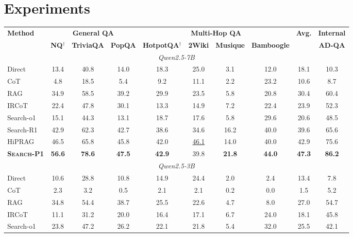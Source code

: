\documentclass[11pt]{article}
\newcommand{\method}{\textsc{Search-P1}\xspace}
\begin{document}
\section{Experiments}
\label{sec:experiments}

\begin{table}[t]
\centering
\small
\setlength{\tabcolsep}{5pt}
\renewcommand{\arraystretch}{1.1}
\begin{tabular}{l|ccc|cccc|c|c}
\toprule
\multirow{2}{*}{\textbf{Method}} & \multicolumn{3}{c|}{\textbf{General QA}} & \multicolumn{4}{c|}{\textbf{Multi-Hop QA}} & \multirow{2}{*}{\textbf{Avg.}} & \textbf{Internal} \\
& \textbf{NQ$^\dagger$} & \textbf{TriviaQA} & \textbf{PopQA} & \textbf{HotpotQA$^\dagger$} & \textbf{2Wiki} & \textbf{Musique} & \textbf{Bamboogle} & & \textbf{AD-QA} \\
\midrule
\multicolumn{10}{c}{\textit{Qwen2.5-7B}} \\
\midrule
Direct & 13.4 & 40.8 & 14.0 & 18.3 & 25.0 & 3.1 & 12.0 & 18.1 & 10.3 \\
CoT & 4.8 & 18.5 & 5.4 & 9.2 & 11.1 & 2.2 & 23.2 & 10.6 & 8.7 \\
RAG & 34.9 & 58.5 & 39.2 & 29.9 & 23.5 & 5.8 & 20.8 & 30.4 & 60.4 \\
IRCoT & 22.4 & 47.8 & 30.1 & 13.3 & 14.9 & 7.2 & 22.4 & 23.9 & 52.3 \\
Search-o1 & 15.1 & 44.3 & 13.1 & 18.7 & 17.6 & 5.8 & 29.6 & 20.6 & 48.5 \\
\midrule
Search-R1 & 42.9 & 62.3 & 42.7 & 38.6 & 34.6 & 16.2 & 40.0 & 39.6 & 65.6 \\
HiPRAG & 46.5 & 65.8 & 45.8 & 42.0 & \underline{46.1} & 14.0 & 40.0 & 42.9 & 75.6 \\
\textbf{\method} & \textbf{56.6} & \textbf{78.6} & \textbf{47.5} & \textbf{42.9} & 39.8 & \textbf{21.8} & \textbf{44.0} & \textbf{47.3} & \textbf{86.2} \\
\midrule
\multicolumn{10}{c}{\textit{Qwen2.5-3B}} \\
\midrule
Direct & 10.6 & 28.8 & 10.8 & 14.9 & 24.4 & 2.0 & 2.4 & 13.4 & 7.8 \\
CoT & 2.3 & 3.2 & 0.5 & 2.1 & 2.1 & 0.2 & 0.0 & 1.5 & 5.2 \\
RAG & 34.8 & 54.4 & 38.7 & 25.5 & 22.6 & 4.7 & 8.0 & 27.0 & 54.7 \\
IRCoT & 11.1 & 31.2 & 20.0 & 16.4 & 17.1 & 6.7 & 24.0 & 18.1 & 45.8 \\
Search-o1 & 23.8 & 47.2 & 26.2 & 22.1 & 21.8 & 5.4 & 32.0 & 25.5 & 42.1 \\

\end{tabular}
\end{table}
\end{document}
